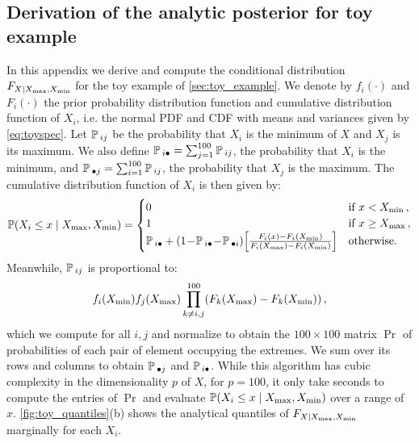 \documentclass[12pt]{article}
\begin{document}
\begin{appendices}

\section{Derivation of the analytic posterior for toy example}
\label{sec:analytical_posterior}

In this appendix we derive and compute the conditional distribution \(F_{X \mid X_{\max},X_{\min}}\) for the toy example of \autoref{sec:toy_example}.
We denote by \(f_i(\cdot)\) and \(F_i(\cdot)\) the prior probability distribution function and cumulative distribution function of \(X_i\), i.e. the normal PDF and CDF with means and variances given by \autoref{eq:toyspec}.
Let \(\operatorname{\mathbb{P}}{}_{ij}\) be the probability that \(X_i\) is the minimum of \(X\) and \(X_j\) is its maximum.
We also define \(\operatorname{\mathbb{P}}{}_{i\bullet} = \sum_{j=1}^{100} \operatorname{\mathbb{P}}{}_{ij}\), the probability that \(X_i\) is the minimum,
and \(\operatorname{\mathbb{P}}{}_{\bullet j} = \sum_{i=1}^{100} \operatorname{\mathbb{P}}{}_{ij}\), the probability that \(X_j\) is the maximum.
The cumulative distribution function of \(X_i\) is then given by:
\begin{equation}
\Pr\del{X_i \leq x \mid \Xmax, \Xmin} =
    \begin{cases}
        0 &\text{if } x < \Xmin \,, \\
        1 &\text{if } x \geq \Xmax \,, \\
        \pxx{i}{\bullet} 
            + \del{1 \!-\! \pxx{i}{\bullet} \!-\! \pxx{\bullet}{i}}
            \sbr{\frac{F_i(x) - F_i(\Xmin) }
                 {F_i(\Xmax) - F_i(\Xmin) }
                } 
            &\text{otherwise.}\\
    \end{cases}
\end{equation}
Meanwhile, \(\operatorname{\mathbb{P}}{}_{ij}\) is proportional to:
\begin{equation}
    f_i(\Xmin)
    f_j(\Xmax)
    \prod_{k \neq i,j}^{100}
    \del{F_k(\Xmax) - F_k(\Xmin)} \,,
\end{equation}
which we compute for all \(i,j\) and normalize
to obtain the \(100 \times 100\) matrix \(\Pr\) of probabilities of each pair of element occupying the extremes.
We sum over its rows and columns to obtain \(\operatorname{\mathbb{P}}{}_{\bullet j}\) and \(\operatorname{\mathbb{P}}{}_{i\bullet}\).
While this algorithm has cubic complexity in the dimensionality \(p\) of \(X\),
for \(p=100\), it only take seconds to compute the entries of \(\Pr\) and evaluate \(\Pr\del{X_i \leq x \mid \Xmax, \Xmin}\) over a range of \(x\).
\autoref{fig:toy_quantiles}(b) shows the analytical quantiles of \(F_{X \mid X_{\max},X_{\min}}\) marginally for each \(X_i\).

\end{appendices}
\end{document}
